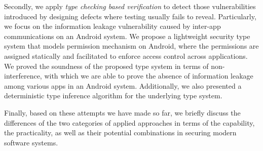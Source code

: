 Secondly, we apply \emph{type checking based verification} to detect those vulnerabilities introduced by designing defects where testing usually fails to reveal. Particularly, we focus on the information leakage vulnerability caused by inter-app communications on an Android system. 
We propose a lightweight security type system that models permission mechanism on Android, where the permissions are assigned statically and facilitated to enforce access control across applications. 
We proved the soundness of the proposed type system in terms of non-interference, with which we are able to prove the absence of information leakage among various apps in an Android system.
 Additionally, we also presented a deterministic type inference algorithm for the underlying type system. 

Finally, based on these attempts we have made so far, we briefly discuss the differences of the two categories of applied approaches in terms of the capability, the practicality, as well as their potential combinations in securing modern software systems.

